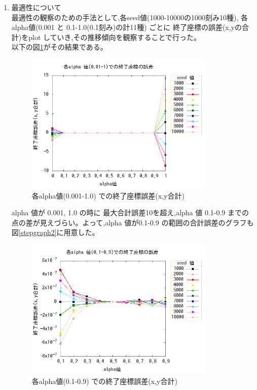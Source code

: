 \begin{enumerate}
  \item 最適性について\\
	最適性の観察のための手法として,各seed値(1000-10000の1000刻み10種),
	各alpha値(0.001 と 0.1-1.0(0.1刻み)の計11種) ごとに
	終了座標の誤差(x,yの合計)をplot していき,その推移傾向を観察することで行った。\\
	以下の図\ref{diffgraph1}がその結果である。


  \begin{figure}[H]
	\begin{center} %
	  \includegraphics[width=9cm]{../steepestsearch2-2/createDiffGraph/DiffGraph.png}
	  \caption{各alpha値(0.001-1.0) での終了座標誤差(x,y合計)} %
	  \label{diffgraph1} %
	\end{center}
  \end{figure}

  alpha 値が 0.001, 1.0 の時に 最大合計誤差10を超え,alpha 値 0.1-0.9 までの
  点の差が見えづらい。よって,alpha 値が0.1-0.9 の範囲の合計誤差のグラフも
  図\ref{stepgraph2}に用意した。
  \begin{figure}[H]
	\begin{center} %
	  \includegraphics[width=9cm]{../steepestsearch2-2/createDiffGraph/DiffGraph2.png}
	  \caption{各alpha値(0.1-0.9) での終了座標誤差(x,y合計)} %
	  \label{diffgraph2} %
	\end{center}
  \end{figure}

  \end{enumerate}

